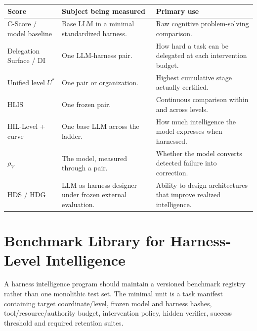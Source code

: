\documentclass[11pt]{article}
\theoremstyle{definition}
\newcommand{\rhov}{\ensuremath{\rho_V}}
\begin{document}
\begin{table}[h]
\centering\small
\begin{tabularx}{\textwidth}{@{}lYY@{}}
\toprule
Score & Subject being measured & Primary use \\
\midrule
C-Score / model baseline & Base LLM in a minimal standardized harness. & Raw cognitive problem-solving comparison. \\
Delegation Surface / DI & One LLM-harness pair. & How hard a task can be delegated at each intervention budget. \\
Unified level $U^{*}$ & One pair or organization. & Highest cumulative stage actually certified. \\
HLIS & One frozen pair. & Continuous comparison within and across levels. \\
HIL-Level + curve & One base LLM across the ladder. & How much intelligence the model expresses when harnessed. \\
\rhov{} & The model, measured through a pair. & Whether the model converts detected failure into correction. \\
HDS / HDG & LLM as harness designer under frozen external evaluation. & Ability to design architectures that improve realized intelligence. \\
\bottomrule
\end{tabularx}
\end{table}

\section{Benchmark Library for Harness-Level Intelligence}

A harness intelligence program should maintain a versioned benchmark registry rather than one monolithic test set. The minimal unit is a task manifest containing target coordinate/level, frozen model and harness hashes, tool/resource/authority budget, intervention policy, hidden verifier, success threshold and required retention suites.
\end{document}
